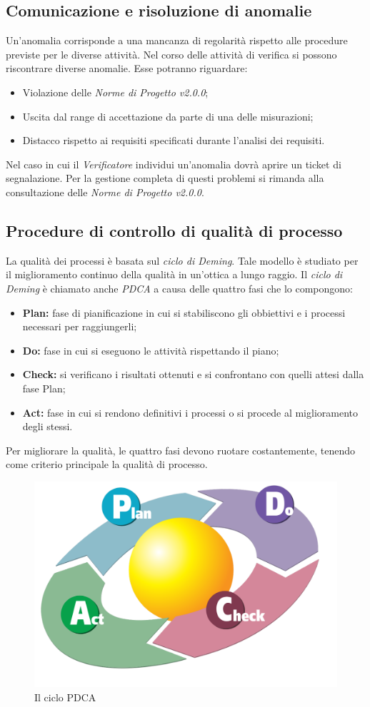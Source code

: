 \subsection{Comunicazione e risoluzione di anomalie}
Un'anomalia corrisponde a una mancanza di regolarità rispetto alle procedure previste per le diverse attività. Nel corso delle attività di verifica si possono riscontrare diverse anomalie. Esse potranno riguardare:
\begin{itemize}
	\item Violazione delle \textit{Norme di Progetto v2.0.0};
	\item Uscita dal range di accettazione da parte di una delle misurazioni;
	\item Distacco rispetto ai requisiti specificati durante l'analisi dei requisiti.
\end{itemize}
Nel caso in cui il \textit{Verificatore} individui un'anomalia dovrà aprire un \gls{ticket} di segnalazione. Per la gestione completa di questi problemi si rimanda alla consultazione delle \textit{Norme di Progetto v2.0.0}.

\subsection{Procedure di controllo di qualità di processo}
La qualità dei processi è basata sul \textit{ciclo di Deming}. Tale modello è studiato per il miglioramento continuo della qualità in un'ottica a lungo raggio.
Il \textit{ciclo di Deming} è chiamato anche \textit{\gls{PDCA}} a causa delle quattro fasi che lo compongono:
\begin{itemize}
	\item \textbf{Plan:} fase di pianificazione in cui si stabiliscono gli obbiettivi e i processi necessari per raggiungerli;
	\item \textbf{Do:} fase in cui si eseguono le attività rispettando il piano;
	\item \textbf{Check:} si verificano i risultati ottenuti e si confrontano con quelli attesi dalla fase Plan;
	\item \textbf{Act:} fase in cui si rendono definitivi i processi o si procede al miglioramento degli stessi. 
\end{itemize}
Per migliorare la qualità, le quattro fasi devono ruotare costantemente, tenendo come criterio principale la qualità di processo.
\begin{figure}[h]
\centering
\includegraphics[width=0.7\linewidth]{img/PDCA_Cycle}
\caption[Il ciclo PDCA]{Il ciclo PDCA}
\label{fig:PDCA_Cycle}
\end{figure}

